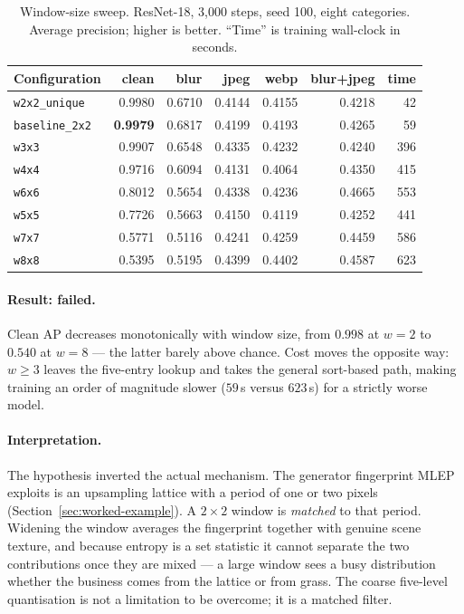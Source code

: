 \begin{table}[t]
  \centering
  \caption{Window-size sweep. ResNet-18, 3{,}000 steps, seed 100, eight
  categories. Average precision; higher is better. ``Time'' is training
  wall-clock in seconds.}
  \label{tab:window}
  \begin{tabular}{lrrrrrr}
    \toprule
    Configuration & clean & blur & jpeg & webp & blur+jpeg & time \\
    \midrule
    \texttt{w2x2\_unique}  & 0.9980 & 0.6710 & 0.4144 & 0.4155 & 0.4218 & 42 \\
    \texttt{baseline\_2x2} & \textbf{0.9979} & 0.6817 & 0.4199 & 0.4193 & 0.4265 & 59 \\
    \texttt{w3x3}          & 0.9907 & 0.6548 & 0.4335 & 0.4232 & 0.4240 & 396 \\
    \texttt{w4x4}          & 0.9716 & 0.6094 & 0.4131 & 0.4064 & 0.4350 & 415 \\
    \texttt{w6x6}          & 0.8012 & 0.5654 & 0.4338 & 0.4236 & 0.4665 & 553 \\
    \texttt{w5x5}          & 0.7726 & 0.5663 & 0.4150 & 0.4119 & 0.4252 & 441 \\
    \texttt{w7x7}          & 0.5771 & 0.5116 & 0.4241 & 0.4259 & 0.4459 & 586 \\
    \texttt{w8x8}          & 0.5395 & 0.5195 & 0.4399 & 0.4402 & 0.4587 & 623 \\
    \bottomrule
  \end{tabular}
\end{table}

\paragraph{Result: failed.} Clean AP decreases monotonically with window size,
from $0.998$ at $w=2$ to $0.540$ at $w=8$ --- the latter barely above chance.
Cost moves the opposite way: $w \geq 3$ leaves the five-entry lookup and takes
the general sort-based path, making training an order of magnitude slower
($59$\,s versus $623$\,s) for a strictly worse model.

\paragraph{Interpretation.} The hypothesis inverted the actual mechanism. The
generator fingerprint MLEP exploits is an upsampling lattice with a period of
one or two pixels (Section~\ref{sec:worked-example}). A $2\times2$ window is
\emph{matched} to that period. Widening the window averages the fingerprint
together with genuine scene texture, and because entropy is a set statistic it
cannot separate the two contributions once they are mixed --- a large window
sees a busy distribution whether the business comes from the lattice or from
grass. The coarse five-level quantisation is not a limitation to be overcome; it
is a matched filter.

